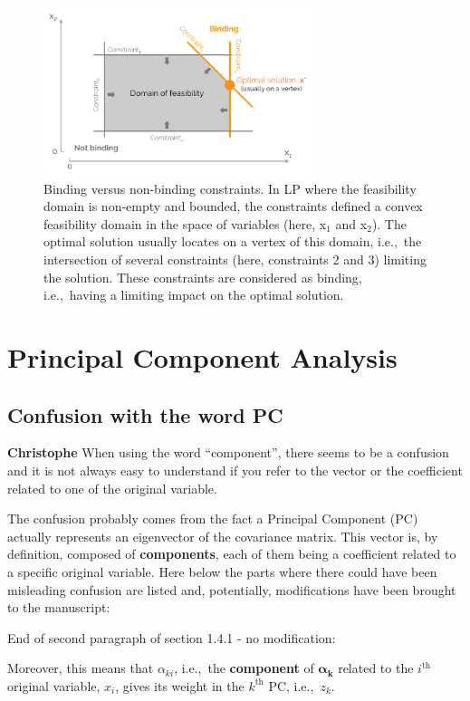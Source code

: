 \documentclass[12pt,a4paper]{article}
\def\ie{i.e.,\ }
\begin{document}
\begin{figure}[!htbp]
\centering
\includegraphics[width=0.7\textwidth]{Binding_constr.pdf}
\caption{Binding versus non-binding constraints. In LP where the feasibility domain is non-empty and bounded, the constraints defined a convex feasibility domain in the space of variables (here, x$_1$ and x$_2$). The optimal solution usually locates on a vertex of this domain, \ie the intersection of several constraints (here, constraints 2 and 3) limiting the solution. These constraints are considered as binding, \ie having a limiting impact on the optimal solution.}
\label{fig:Binding_constr}
\end{figure}

\section{Principal Component Analysis}
\label{PCA}

\subsection{Confusion with the word PC}
\label{Confusion_PC_wording}


\begin{mdframed}[style=comment] %
{\color{violet} \textbf{Christophe}} When using the word ``component'', there seems to be a confusion and it is not always easy to understand if you refer to the vector or the coefficient related to one of the original variable.
\end{mdframed}

\noindent The confusion probably comes from the fact a Principal Component (PC) actually represents an eigenvector of the covariance matrix. This vector is, by definition, composed of \textbf{components}, each of them being a coefficient related to a specific original variable. Here below the parts where there could have been misleading confusion are listed and, potentially, modifications have been brought to the manuscript:

{\color{blue} End of second paragraph of section 1.4.1 - no modification}:

\begin{mdframed}[style=manuscript] %
Moreover, this means that $\alpha_{ki}$, \ie the \textbf{component} of $\bm{\alpha}_{\mathbf{k}}$ related to the $i^{\text{th}}$ original variable, $x_i$,  gives its weight in the $k^{\text{th}}$ PC, \ie $z_k$. 
\end{mdframed}


\clearpage
\def\bibfont{\scriptsize}

\normalsize
\end{document}
